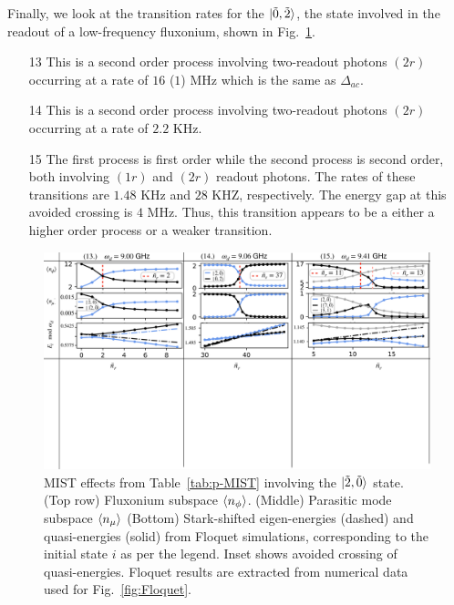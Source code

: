 \documentclass[prx,showpacs,notitlepage,twocolumn,superscriptaddress,nofootinbib,preprintnumbers,floatfix]{revtex4-2}
\begin{document}
Finally, we look at the transition rates for the $\ket{\tilde{0},\tilde{2}}$, the state involved in the readout of a low-frequency fluxonium, shown in Fig.~\ref{fig:Trans2}.
\begin{itemize}
    \item[13] This is a second order process involving two-readout photons $(2r)$ occurring at a rate of $16$ ($1$) MHz which is the same as $\Delta_{ac}$.
    \item[14] This is a second order process involving two-readout photons $(2r)$ occurring at a rate of $2.2$ KHz.
    \item[15] The first process is first order while the second process is second order, both involving $(1r)$ and $(2r)$ readout photons. The rates of these transitions are $1.48$ KHz and $28$ KHZ, respectively. The energy gap at this avoided crossing is $4$ MHz. Thus, this transition appears to be a either a higher order process or a weaker transition.
\end{itemize}
\begin{figure}
    \centering
    \includegraphics[width=1.0\textwidth]{Figures/Trans2.pdf}
    \caption{MIST effects from Table~\ref{tab:p-MIST} involving the $\ket{\tilde{2},\tilde{0}}$ state. (Top row) Fluxonium subspace $\braket{n_\phi}$. (Middle) Parasitic mode subspace $\braket{n_\mu}$ (Bottom) Stark-shifted eigen-energies (dashed) and quasi-energies (solid) from Floquet simulations, corresponding to the initial state $i$ as per the legend. Inset shows avoided crossing of quasi-energies. Floquet results are extracted from numerical data used for Fig.~\ref{fig:Floquet}.}
    \label{fig:Trans2}
\end{figure}
\end{document}
